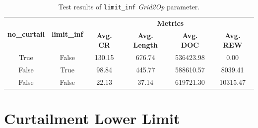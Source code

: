 \begin{table}[H]
	\centering
	\caption{Test results of \texttt{limit\_inf} \textit{Grid2Op} parameter.}
	\begin{tabular}{cccccc}
		\toprule
		\multirow{2}{*}{\textbf{no\_curtail}} & \multirow{2}{*}{\textbf{limit\_inf}} & \multicolumn{4}{c}{\textbf{Metrics}} \\ 
		\cmidrule(lr){3-6}
		&  & \textbf{Avg. CR} & \textbf{Avg. Length} & \textbf{Avg. DOC} & \textbf{Avg. REW} \\ 
		\midrule
		True & False & 130.15 & 676.74 & 536423.98 & 0.00 \\
		False & True  & 98.84 & 445.77 & 588610.57 & 8039.41 \\
		False & False & 22.13 & 37.14 & 619721.30 & 10315.47 \\
		
		\bottomrule
	\end{tabular}
	\label{tab:test-limit2}
\end{table}

\section{Curtailment Lower Limit}

